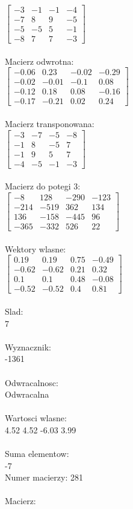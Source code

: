 \documentclass[a4paper,12pt]{article}
\begin{document}
$\begin{bmatrix} -3&-1&-1&-4\\-7&8&9&-5\\-5&-5&5&-1\\-8&7&7&-3 \end{bmatrix}$
\\
\\
Macierz odwrotna:\\

$\begin{bmatrix} -0.06&0.23&-0.02&-0.29\\-0.02&-0.01&-0.1&0.08\\-0.12&0.18&0.08&-0.16\\-0.17&-0.21&0.02&0.24 \end{bmatrix}$
\\
\\
Macierz transponowana:\\

$\begin{bmatrix} -3&-7&-5&-8\\-1&8&-5&7\\-1&9&5&7\\-4&-5&-1&-3 \end{bmatrix}$
\\
\\
Macierz do potegi 3:\\

$\begin{bmatrix} -8&128&-290&-123\\-214&-519&362&134\\136&-158&-445&96\\-365&-332&526&22 \end{bmatrix}$
\\
\\
Wektory wlasne:\\

$\begin{bmatrix} 0.19&0.19&0.75&-0.49\\-0.62&-0.62&0.21&0.32\\0.1&0.1&0.48&-0.08\\-0.52&-0.52&0.4&0.81 \end{bmatrix}$
\\
\\
Slad:\\
7
\\
\\
Wyznacznik:\\
-1361
\\
\\
Odwracalnosc:\\
Odwracalna
\\
\\
Wartosci wlasne:\\
4.52 4.52 -6.03 3.99
\\
\\
Suma elementow:\\
-7
\\
\newpage
Numer macierzy:
281
\\
\\
Macierz:\\
\end{document}
